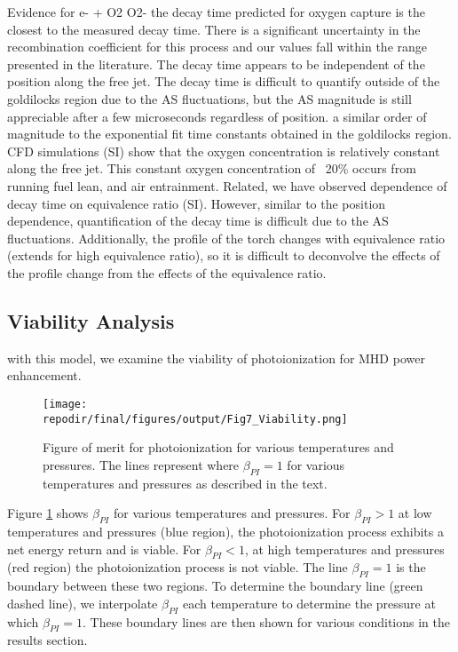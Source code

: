 \begin{outline}
    
\1 Evidence for e- + O2 \rightarrow O2-
    \2 the decay time predicted for oxygen capture is the closest to the measured decay time. There is a significant uncertainty in the recombination coefficient for this process and our values fall within the range presented in the literature. 
    \2 The decay time appears to be independent of the position along the free jet. The decay time is difficult to quantify outside of the goldilocks region due to the AS fluctuations, but the AS magnitude is still appreciable after a few microseconds regardless of position. a similar order of magnitude to the exponential fit time constants obtained in the goldilocks region. CFD simulations (SI) show that the oxygen concentration is relatively constant along the free jet. This constant oxygen concentration of ~20\% occurs from running fuel lean, and air entrainment. 
    \2 Related, we have observed dependence of decay time on equivalence ratio (SI). However, similar to the position dependence, quantification of the decay time is difficult due to the AS fluctuations. Additionally, the profile of the torch changes with equivalence ratio (extends for high equivalence ratio), so it is difficult to deconvolve the effects of the profile change from the effects of the equivalence ratio.
\end{outline}



\subsection{Viability Analysis}

with this model, we examine the viability of photoionization for MHD power enhancement. 


\begin{figure}[h]
    \centering
    \texttt{[image: \\repodir/final/figures/output/Fig7\_Viability.png]} 
    \caption{Figure of merit for photoionization for various temperatures and pressures. The lines represent where $\beta_{PI} = 1$ for various temperatures and pressures as described in the text.}   
    \label{fig:viability_beta}
\end{figure}

Figure \ref{fig:viability_beta} shows $\beta_{PI}$ for various temperatures and pressures.  For $\beta_{PI} > 1$ at low temperatures and pressures (blue region), the photoionization process exhibits a net energy return and is viable. For $\beta_{PI} < 1$, at high temperatures and pressures (red region) the photoionization process is not viable. The line $\beta_{PI} = 1$ is the boundary between these two regions. To determine the boundary line (green dashed  line), we interpolate $\beta_{PI}$ each temperature to determine the pressure at which $\beta_{PI} = 1$. These boundary lines are then shown for various conditions in the results section.

